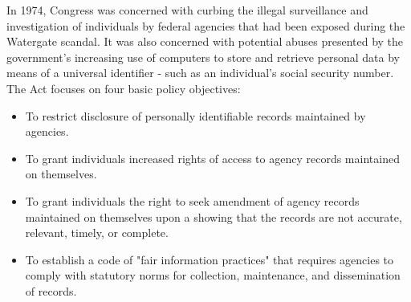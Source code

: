 \documentclass{mcmthesis}
\begin{document}
\begin{appendix}
In 1974, Congress was concerned with curbing the illegal surveillance and investigation of individuals by federal agencies that had been exposed during the Watergate scandal.  It was also concerned with potential abuses presented by the government's increasing use of computers to store and retrieve personal data by means of a universal identifier - such as an individual's social security number.  The Act focuses on four basic policy objectives:
\begin{itemize}
\item To restrict disclosure of personally identifiable records maintained by agencies.
\item To grant individuals increased rights of access to agency records maintained on themselves.
\item To grant individuals the right to seek amendment of agency records maintained on themselves upon a showing that the records are not accurate, relevant, timely, or complete.
\item To establish a code of "fair information practices" that requires agencies to comply with statutory norms for collection, maintenance, and dissemination of records.
\end{itemize}


\end{appendix}
	
	


%
%
\end{document}
